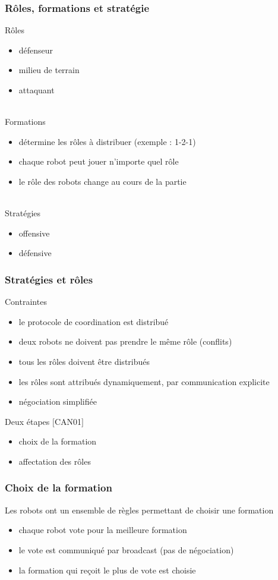 \documentclass{beamer}
\begin{document}
\begin{frame}
\frametitle{Rôles, formations et stratégie}
Rôles
\begin{itemize}
	\item défenseur
    \item milieu de terrain
    \item attaquant
\end{itemize}
~\\
Formations
\begin{itemize}
	\item détermine les rôles à distribuer (exemple : 1-2-1)
    \item chaque robot peut jouer n'importe quel rôle
    \item le rôle des robots change au cours de la partie
\end{itemize}
~\\
Stratégies
\begin{itemize}
	\item offensive
    \item défensive
\end{itemize}
\end{frame}


\begin{frame}
\frametitle{Stratégies et rôles}
Contraintes
\begin{itemize}
	\item le protocole de coordination est distribué
	\item deux robots ne doivent pas prendre le même rôle (conflits)
	\item tous les rôles doivent être distribués
	\item les rôles sont attribués dynamiquement, par communication explicite
    \item négociation simplifiée
\end{itemize}

Deux étapes $[$CAN01$]$
\begin{itemize}
	\item choix de la formation
	\item affectation des rôles
\end{itemize}
\end{frame}


\begin{frame}
\frametitle{Choix de la formation}
Les robots ont un ensemble de règles permettant de choisir une formation
\begin{itemize}
	\item chaque robot vote pour la meilleure formation
	\item le vote est communiqué par broadcast (pas de négociation)
	\item la formation qui reçoit le plus de vote est choisie
\end{itemize}
\end{frame}
\end{document}
